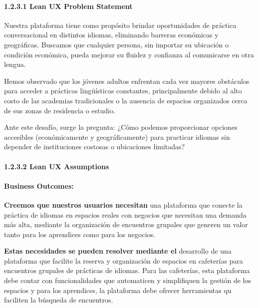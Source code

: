 \paragraph{1.2.3.1 Lean UX Problem
Statement}\label{report__10-cap1-introduccion.md__lean-ux-problem-statement}

Nuestra plataforma tiene como propósito brindar oportunidades de
práctica conversacional en distintos idiomas, eliminando barreras
económicas y geográficas. Buscamos que cualquier persona, sin importar
su ubicación o condición económica, pueda mejorar su fluidez y confianza
al comunicarse en otra lengua.

Hemos observado que los jóvenes adultos enfrentan cada vez mayores
obstáculos para acceder a prácticas lingüísticas constantes,
principalmente debido al alto costo de las academias tradicionales o la
ausencia de espacios organizados cerca de sus zonas de residencia o
estudio.

Ante este desafío, surge la pregunta: ¿Cómo podemos proporcionar
opciones accesibles (económicamente y geográficamente) para practicar
idiomas sin depender de instituciones costosas o ubicaciones limitadas?

\paragraph{1.2.3.2 Lean UX
Assumptions}\label{report__10-cap1-introduccion.md__lean-ux-assumptions}

\paragraph{Business
Outcomes:}\label{report__10-cap1-introduccion.md__business-outcomes}

\textbf{Creemos que nuestros usuarios necesitan} una plataforma que
conecte la práctica de idiomas en espacios reales con negocios que
necesitan una demanda más alta, mediante la organización de encuentros
grupales que generen un valor tanto para los aprendices como para los
negocios.

\textbf{Estas necesidades se pueden resolver mediante el} desarrollo de
una plataforma que facilite la reserva y organización de espacios en
cafeterías para encuentros grupales de prácticas de idiomas. Para las
cafeterías, esta plataforma debe contar con funcionalidades que
automaticen y simplifiquen la gestión de los espacios y para los
aprendices, la plataforma debe ofrecer herramientas qu faciliten la
búsqueda de encuentros.

